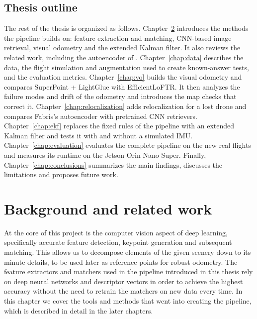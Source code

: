 \documentclass[english, Lau, oneside]{sapthesis}%
\begin{document}
\section{Thesis outline}
\label{sec:intro-outline}
The rest of the thesis is organized as follows. Chapter~\ref{chap:background} introduces the methods the pipeline builds on: feature extraction and matching, CNN-based image retrieval, visual odometry and the extended Kalman filter. It also reviews the related work, including the autoencoder of \citet{fabris2025thesis}. Chapter~\ref{chap:data} describes the data, the flight simulation and augmentation used to create known-answer tests, and the evaluation metrics. Chapter~\ref{chap:vo} builds the visual odometry and compares SuperPoint + LightGlue with EfficientLoFTR. It then analyzes the failure modes and drift of the odometry and introduces the map checks that correct it. Chapter~\ref{chap:relocalization} adds relocalization for a lost drone and compares Fabris's autoencoder with pretrained CNN retrievers. Chapter~\ref{chap:ekf} replaces the fixed rules of the pipeline with an extended Kalman filter and tests it with and without a simulated IMU. Chapter~\ref{chap:evaluation} evaluates the complete pipeline on the new real flights and measures its runtime on the Jetson Orin Nano Super. Finally, Chapter~\ref{chap:conclusions} summarizes the main findings, discusses the limitations and proposes future work.

\chapter{Background and related work}
\label{chap:background}
At the core of this project is the computer vision aspect of deep learning, specifically accurate feature detection, keypoint generation and subsequent matching. This allows us to decompose elements of the given scenery down to its minute details, to be used later as reference points for robust odometry. The feature extractors and matchers used in the pipeline introduced in this thesis rely on deep neural networks and descriptor vectors in order to achieve the highest accuracy without the need to retrain the matchers on new data every time. In this chapter we cover the tools and methods that went into creating the pipeline, which is described in detail in the later chapters.
\end{document}
